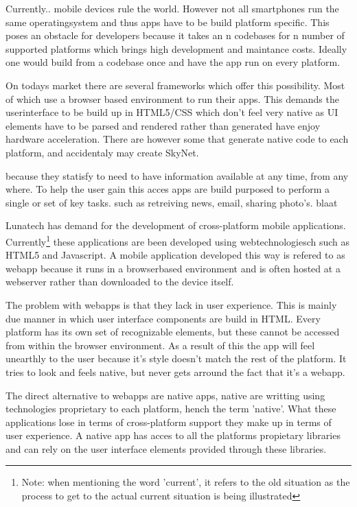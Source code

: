 
\ifdraftmode
Currently.. mobile devices rule the world. However not all smartphones run the same operatingsystem and thus apps have to be build platform specific.  This poses an obstacle for developers because it takes an n codebases for n number of supported platforms which brings high development and maintance costs. Ideally one would build from a codebase once and have the app run on every platform. 

On todays market there are several frameworks which offer this possibility. Most of which use a browser based environment to run their apps. This demands the userinterface to be build up in HTML5/CSS which don't feel very native as UI elements have to be parsed and rendered rather than generated have enjoy hardware acceleration. There are however some that generate native code to each platform, and accidentaly may create SkyNet.

because they statisfy to need to have information available at any time, from any where. To help the user gain this acces apps are build purposed to perform a single or set of key tasks. such as retreiving news, email, sharing photo's. blaat\cite{Ni2006}
\fi
{}



Lunatech has demand for the development of cross-platform mobile applications. Currently\footnote{Note: when mentioning the word 'current', it refers to the old situation as the process to get to the actual current situation is being illustrated} these applications are been developed using webtechnologiesch such as HTML5 and Javascript. A mobile application developed this way is refered to as webapp because it runs in a browserbased environment and is often hosted at a webserver rather than downloaded to the device itself.

The problem with webapps is that they lack in user experience. This is mainly due manner in which user interface components are build in HTML. Every platform has its own set of recognizable elements, but these cannot be accessed from within the browser environment. As a result of this the app will feel unearthly to the user because it's style doesn't match the rest of the platform. It tries to look and feels native, but never gets arround the fact that it's a webapp.

The direct alternative to webapps are native apps, native are writting using technologies proprietary to each platform, hench the term 'native'. What these applications lose in terms of cross-platform support they make up in terms of user experience.  A native app has acces to all the platforms propietary libraries and can rely on the user interface elements provided through these libraries.

